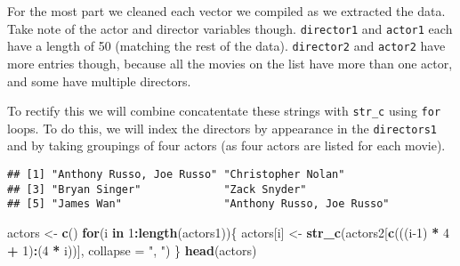 \documentclass[]{article}
\newenvironment{Shaded}{\begin{snugshade}}{\end{snugshade}}
\newcommand{\ControlFlowTok}[1]{\textcolor[rgb]{0.13,0.29,0.53}{\textbf{#1}}}
\newcommand{\DataTypeTok}[1]{\textcolor[rgb]{0.13,0.29,0.53}{#1}}
\newcommand{\DecValTok}[1]{\textcolor[rgb]{0.00,0.00,0.81}{#1}}
\newcommand{\KeywordTok}[1]{\textcolor[rgb]{0.13,0.29,0.53}{\textbf{#1}}}
\newcommand{\NormalTok}[1]{#1}
\newcommand{\OperatorTok}[1]{\textcolor[rgb]{0.81,0.36,0.00}{\textbf{#1}}}
\newcommand{\StringTok}[1]{\textcolor[rgb]{0.31,0.60,0.02}{#1}}
\begin{document}
For the most part we cleaned each vector we compiled as we extracted the
data. Take note of the actor and director variables though.
\texttt{director1} and \texttt{actor1} each have a length of 50
(matching the rest of the data). \texttt{director2} and \texttt{actor2}
have more entries though, because all the movies on the list have more
than one actor, and some have multiple directors.

To rectify this we will combine concatentate these strings with
\texttt{str\_c} using \texttt{for} loops. To do this, we will index the
directors by appearance in the \texttt{directors1} and by taking
groupings of four actors (as four actors are listed for each movie).

\begin{Shaded}
\end{Shaded}

\begin{verbatim}
## [1] "Anthony Russo, Joe Russo" "Christopher Nolan"       
## [3] "Bryan Singer"             "Zack Snyder"             
## [5] "James Wan"                "Anthony Russo, Joe Russo"
\end{verbatim}

\begin{Shaded}
\begin{Highlighting}[]
\NormalTok{actors <-}\StringTok{ }\KeywordTok{c}\NormalTok{()}
\ControlFlowTok{for}\NormalTok{(i }\ControlFlowTok{in} \DecValTok{1}\OperatorTok{:}\KeywordTok{length}\NormalTok{(actors1))\{}
\NormalTok{  actors[i] <-}\StringTok{ }\KeywordTok{str_c}\NormalTok{(actors2[}\KeywordTok{c}\NormalTok{(((i}\DecValTok{-1}\NormalTok{) }\OperatorTok{*}\StringTok{ }\DecValTok{4} \OperatorTok{+}\StringTok{ }\DecValTok{1}\NormalTok{)}\OperatorTok{:}\NormalTok{(}\DecValTok{4} \OperatorTok{*}\StringTok{ }\NormalTok{i))], }\DataTypeTok{collapse =} \StringTok{", "}\NormalTok{)}
\NormalTok{\}}
\KeywordTok{head}\NormalTok{(actors)}
\end{Highlighting}
\end{Shaded}
\end{document}
